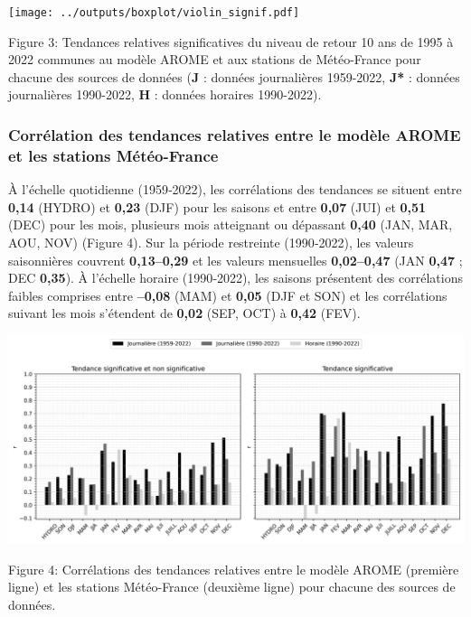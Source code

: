 \documentclass[
  article,
  nofooter,
  noheadings]{jss}
\begin{document}
\texttt{[image: ../outputs/boxplot/violin\_signif.pdf]}

\begin{center}
Figure 3: Tendances relatives significatives du niveau de retour 10 ans de 1995 à 2022 communes au modèle AROME et aux stations de Météo-France pour chacune des sources de données (\textbf{J} : données journalières 1959-2022, \textbf{J*} : données journalières 1990-2022, \textbf{H} : données horaires 1990-2022).
\end{center}

\subsubsection{Corrélation des tendances relatives entre le modèle AROME
et les stations
Météo-France}\label{corruxe9lation-des-tendances-relatives-entre-le-moduxe8le-arome-et-les-stations-muxe9tuxe9o-france}

À l'échelle quotidienne (1959‑2022), les corrélations des tendances se
situent entre \textbf{0,14} (HYDRO) et \textbf{0,23} (DJF) pour les
saisons et entre \textbf{0,07} (JUI) et \textbf{0,51} (DEC) pour les
mois, plusieurs mois atteignant ou dépassant \textbf{0,40} (JAN, MAR,
AOU, NOV) (Figure 4). Sur la période restreinte (1990‑2022), les valeurs
saisonnières couvrent \textbf{0,13--0,29} et les valeurs mensuelles
\textbf{0,02--0,47} (JAN \textbf{0,47} ; DEC \textbf{0,35}). À l'échelle
horaire (1990‑2022), les saisons présentent des corrélations faibles
comprises entre \textbf{--0,08} (MAM) et \textbf{0,05} (DJF et SON) et
les corrélations suivant les mois s'étendent de \textbf{0,02} (SEP, OCT)
à \textbf{0,42} (FEV).

\includegraphics[width=1\linewidth,height=\textheight,keepaspectratio]{figures/histo_z_T_p.png}

\begin{center}
Figure 4: Corrélations des tendances relatives entre le modèle AROME (première ligne) et les stations Météo-France (deuxième ligne) pour chacune des sources de données.
\end{center}
\end{document}
